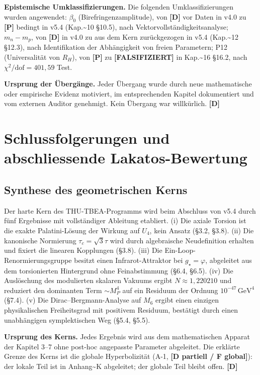﻿\documentclass[11pt,letterpaper]{article}
\begin{document}
\textbf{Epistemische Umklassifizierungen.} Die folgenden Umklassifizierungen wurden angewendet: $\beta_0$ (Birefringenzamplitude), von \textbf{[D]} vor Daten in v4.0 zu \textbf{[P]} bedingt in v5.4 (Kap.\textasciitilde{}10 §10.5), nach Vektorvollständigkeitsanalyse; $m_n - m_p$, von \textbf{[D]} in v4.0 zu aus dem Kern zurückgezogen in v5.4 (Kap.\textasciitilde{}12 §12.3), nach Identifikation der Abhängigkeit von freien Parametern; P12 (Universalität von $R_H$), von \textbf{[P]} zu \textbf{[FALSIFIZIERT]} in Kap.\textasciitilde{}16 §16.2, nach $\chi^2/\text{dof} = 401{,}59$ Test.

\textbf{Ursprung der Übergänge.} Jeder Übergang wurde durch neue mathematische oder empirische Evidenz motiviert, im entsprechenden Kapitel dokumentiert und vom externen Auditor genehmigt. Kein Übergang war willkürlich. \textbf{[D]}

\section{Schlussfolgerungen und abschliessende Lakatos-Bewertung}
\subsection{Synthese des geometrischen Kerns}
Der harte Kern des THU-TBEA-Programms wird beim Abschluss von v5.4 durch fünf Ergebnisse mit vollständiger Ableitung etabliert. (i) Die axiale Torsion ist die exakte Palatini-Lösung der Wirkung auf $U_4$, kein Ansatz (§3.2, §3.8). (ii) Die kanonische Normierung $\tau_c = \sqrt{3}\tau$ wird durch algebraische Neudefinition erhalten und fixiert die linearen Kopplungen (§3.8). (iii) Die Ein-Loop-Renormierungsgruppe besitzt einen Infrarot-Attraktor bei $g_\star = \varphi$, abgeleitet aus dem torsionierten Hintergrund ohne Feinabstimmung (§6.4, §6.5). (iv) Die Auslöschung des modulierten skalaren Vakuums ergibt $N \approx 1{,}220210$ und reduziert den dominanten Term $\sim M_P^4$ auf ein Residuum der Ordnung $10^{-47}\,\text{GeV}^4$ (§7.4). (v) Die Dirac--Bergmann-Analyse auf $M_6$ ergibt einen einzigen physikalischen Freiheitsgrad mit positivem Residuum, bestätigt durch einen unabhängigen symplektischen Weg (§5.4, §5.5).

\textbf{Ursprung des Kerns.} Jedes Ergebnis wird aus dem mathematischen Apparat der Kapitel 3--7 ohne post-hoc angepasste Parameter abgeleitet. Die erklärte Grenze des Kerns ist die globale Hyperbolizität (A-1, \textbf{[D partiell / F global]}): der lokale Teil ist in Anhang\textasciitilde{}K abgeleitet; der globale Teil bleibt offen. \textbf{[D]}
\end{document}
